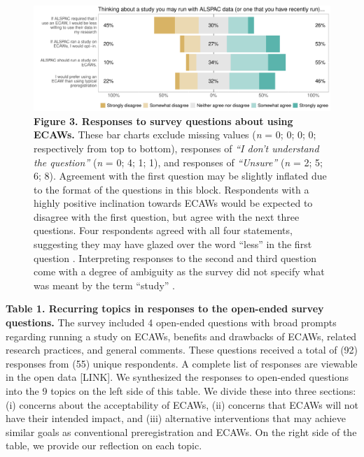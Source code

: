 \documentclass[
  man,floatsintext]{apa6}
\begin{document}
\begin{figure}

{\centering \includegraphics[width=1\linewidth]{figs/alspacPlot-1} 

}

\caption{\textbf{Figure 3. Responses to survey questions about using ECAWs.} These bar charts exclude missing values (\emph{n} = 0; 0; 0; 0; respectively from top to bottom), responses of \emph{``I don't understand the question''} (\emph{n} = 0; 4; 1; 1), and responses of \emph{``Unsure''} (\emph{n} = 2; 5; 6; 8). Agreement with the first question may be slightly inflated due to the format of the questions in this block. Respondents with a highly positive inclination towards ECAWs would be expected to disagree with the first question, but agree with the next three questions. Four respondents agreed with all four statements, suggesting they may have glazed over the word ``less'' in the first question \protect\footnotemark[3]. Interpreting responses to the second and third question come with a degree of ambiguity as the survey did not specify what was meant by the term ``study'' \protect\footnotemark[4].}\label{fig:alspacPlot}
\end{figure}



\protect{}
\protect{}

\textbf{Table 1. Recurring topics in responses to the open-ended survey questions.} The survey included 4 open-ended questions with broad prompts regarding running a study on ECAWs, benefits and drawbacks of ECAWs, related research practices, and general comments. These questions received a total of (92) responses from (55) unique respondents. A complete list of responses are viewable in the open data {[}LINK{]}. We synthesized the responses to open-ended questions into the 9 topics on the left side of this table. We divide these into three sections: (i) concerns about the acceptability of ECAWs, (ii) concerns that ECAWs will not have their intended impact, and (iii) alternative interventions that may achieve similar goals as conventional preregistration and ECAWs. On the right side of the table, we provide our reflection on each topic.
\end{document}
